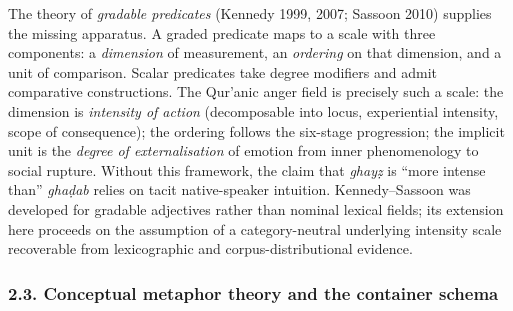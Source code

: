 The theory of \emph{gradable predicates} (Kennedy 1999, 2007; Sassoon
2010) supplies the missing apparatus. A graded predicate maps to a scale
with three components: a \emph{dimension} of measurement, an
\emph{ordering} on that dimension, and a unit of comparison. Scalar
predicates take degree modifiers and admit comparative constructions.
The Qur'anic anger field is precisely such a scale: the dimension is
\emph{intensity of action} (decomposable into locus, experiential
intensity, scope of consequence); the ordering follows the six-stage
progression; the implicit unit is the \emph{degree of externalisation}
of emotion from inner phenomenology to social rupture. Without this
framework, the claim that \emph{ghayẓ} is ``more intense than''
\emph{ghaḍab} relies on tacit native-speaker intuition. Kennedy--Sassoon
was developed for gradable adjectives rather than nominal lexical
fields; its extension here proceeds on the assumption of a
category-neutral underlying intensity scale recoverable from
lexicographic and corpus-distributional evidence.

\subsubsection{2.3. Conceptual metaphor theory and the container
schema}\label{conceptual-metaphor-theory-and-the-container-schema}

